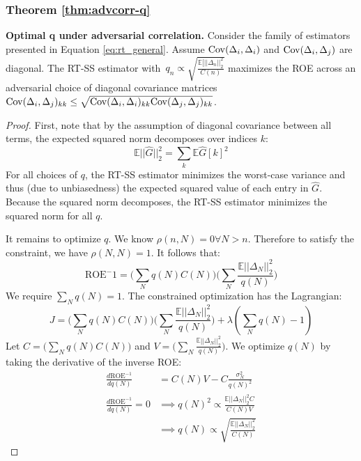 \subsubsection{Theorem \ref{thm:advcorr-q}}
\textbf{Optimal q under adversarial correlation.}
Consider the family of estimators presented in Equation  \ref{eq:rt_general}.
Assume $\mathrm{Cov}(\Delta_i, \Delta_i)$ and $\mathrm{Cov}(\Delta_i, \Delta_j)$ are diagonal.
The RT-SS estimator with~${q_n \propto \sqrt{\frac{\mathbb{E}[||\Delta_n||_2^2}{C(n)}}}$ maximizes the ROE across an adversarial choice of diagonal covariance matrices~${\mathrm{Cov}(\Delta_i, \Delta_j)_{kk} \leq \sqrt{\mathrm{Cov}(\Delta_i, \Delta_i)_{kk} \mathrm{Cov}(\Delta_j, \Delta_j)_{kk}}}$.
\begin{proof}
First, note that by the assumption of diagonal covariance between all terms,
the expected squared norm decomposes over indices $k$:
\[
\mathbb{E} ||\hat{G}||_2^2 = \sum_k \mathbb{E} \hat{G}[k]^2
\]
For all choices of $q$, the RT-SS estimator minimizes the worst-case variance and thus
(due to unbiasedness) the expected squared value of each entry in $\hat{G}$.
Because the squared norm decomposes, the RT-SS estimator minimizes the squared
norm for all $q$.

It remains to optimize $q$. We know $\rho(n, N) = 0 \forall N > n$.
Therefore to satisfy the constraint, we have $\rho(N, N) = 1$.
It follows that:
\[
\text{ROE}^-1 = \big( \sum_N q(N) C(N) \big) \big(\sum_N \frac{\mathbb{E}||\Delta_N||_2^2}{q(N)} \big)
\]
We require $\sum_N q(N) = 1$. The constrained optimization has the Lagrangian:
\[
J = \Big( \sum_N q(N) C(N) \Big) \Big(\sum_N \frac{\mathbb{E}||\Delta_N||_2^2}{q(N)}\Big) + \lambda (\sum_N q(N) - 1)
\]
Let $C = \Big( \sum_N q(N) C(N) \Big)$ and $V = \Big(\sum_N \frac{\mathbb{E}||\Delta_N||_2^2}{q(N)}\Big)$. We optimize $q(N)$ by taking the derivative of the inverse ROE:
\begin{align*}
\frac{d\text{ROE}^{-1}}{dq(N)} &= C(N) V - C \frac{\sigma_N^2}{q(N)^2}\\
\frac{d\text{ROE}^{-1}}{dq(N)} = 0 &\implies q(N)^2 \propto \frac{\mathbb{E}||\Delta_N||_2^2 C}{C(N) V}\\
&\implies q(N) \propto \sqrt{\frac{\mathbb{E}||\Delta_N||^2_2}{C(N)}}
\end{align*}
\end{proof}

